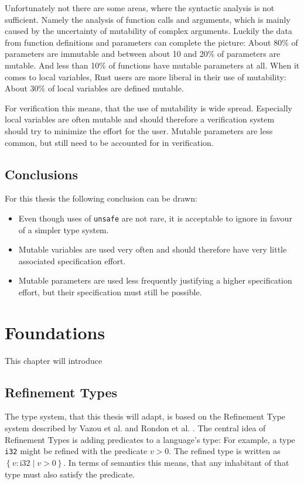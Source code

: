 \documentclass{book}
\newcommand{\code}[1]{\texttt{#1}}
\theoremstyle{definition}
\begin{document}
Unfortunately not there are some areas, where the syntactic analysis is not sufficient. Namely the analysis of function calls and arguments, which is mainly caused by the uncertainty of mutability of complex arguments.
Luckily the data from function definitions and parameters can complete the picture: About 80\% of parameters are immutable and between about 10 and 20\% of parameters are mutable. And less than 10\% of functions have mutable parameters at all.
When it comes to local variables, Rust users are more liberal in their use of mutability:
About 30\% of local variables are defined mutable.

For verification this means, that the use of mutability is wide spread. Especially local variables are often mutable and should therefore a verification system should try to minimize the effort for the user. Mutable parameters are less common, but still need to be accounted for in verification.

\section{Conclusions}

For this thesis the following conclusion can be drawn:

\begin{itemize}
  \item Even though uses of \code{unsafe} are not rare, it is acceptable to ignore in favour of a simpler type system.
  \item Mutable variables are used very often and should therefore have very little associated specification effort.
  \item Mutable parameters are used less frequently justifying a higher specification effort, but their specification must still be possible.
\end{itemize}

\chapter{Foundations}

This chapter will introduce 


\section{Refinement Types}

The type system, that this thesis will adapt, is based on the Refinement Type system described by Vazou et al. \cite{vazou_abstract_2013} and Rondon et al. \cite{rondon_liquid_2008}. 
The central idea of Refinement Types is adding predicates to a language's type: For example, a type \code{i32} might be refined with the predicate $v > 0$. The refined type is written as $\left\{ v : \text{i32} \mid v > 0 \right\}$. In terms of semantics this means, that any inhabitant of that type must also satisfy the predicate. 
\end{document}
